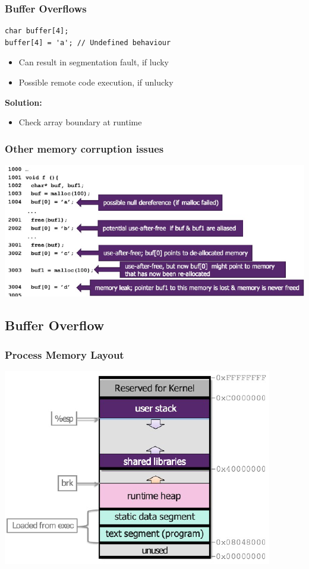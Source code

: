 \subsubsection{Buffer Overflows}
\begin{lstlisting}
char buffer[4];
buffer[4] = 'a'; // Undefined behaviour
\end{lstlisting}
\begin{itemize}
    \item Can result in segmentation fault, if lucky
    \item Possible remote code execution, if unlucky
\end{itemize}
\textbf{Solution:}
\begin{itemize}
    \item Check array boundary at runtime
\end{itemize}

\subsubsection{Other memory corruption issues}
\includegraphics[width=\linewidth]{../img/memory_corruptions.png}

\subsection{Buffer Overflow}
\subsubsection{Process Memory Layout}
\includegraphics[width=0.6\linewidth]{../img/process_memory_layout.png}
